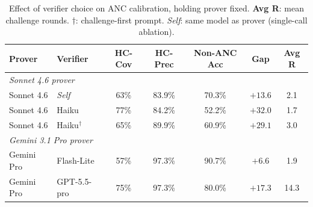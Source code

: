 \begin{table}[h]
\centering
\caption{Effect of verifier choice on ANC calibration, holding prover fixed. \textbf{Avg R}: mean challenge rounds. $\dagger$: challenge-first prompt. \emph{Self}: same model as prover (single-call ablation).}
\label{tab:verifier}
\small
\setlength{\tabcolsep}{5pt}
\begin{tabular}{llccccc}
\toprule
\textbf{Prover} & \textbf{Verifier} & \textbf{HC-Cov} & \textbf{HC-Prec} & \textbf{Non-ANC Acc} & \textbf{Gap} & \textbf{Avg R} \\
\midrule
\multicolumn{7}{l}{\textit{Sonnet 4.6 prover}} \\
Sonnet 4.6 & \emph{Self} & 63\% & 83.9\% & 70.3\% & $+13.6$ & 2.1 \\
Sonnet 4.6 & Haiku & 77\% & 84.2\% & 52.2\% & $+32.0$ & 1.7 \\
Sonnet 4.6 & Haiku$^\dagger$ & 65\% & 89.9\% & 60.9\% & $+29.1$ & 3.0 \\
\midrule
\multicolumn{7}{l}{\textit{Gemini 3.1 Pro prover}} \\
Gemini Pro & Flash-Lite & 57\% & 97.3\% & 90.7\% & $+6.6$ & 1.9 \\
Gemini Pro & GPT-5.5-pro & 75\% & 97.3\% & 80.0\% & $+17.3$ & 14.3 \\
\bottomrule
\end{tabular}
\end{table}
